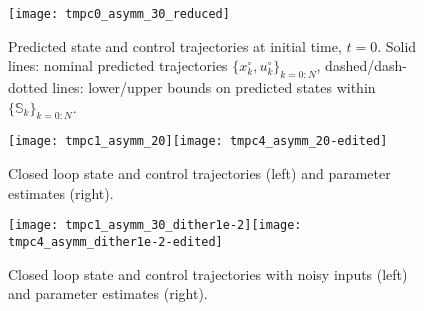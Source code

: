 \documentclass[final,5p,times,twocolumn,authoryear]{elsarticle}
\def\S{\mathbb{S}}
\begin{document}
\begin{figure}[ht]
\centerline{\texttt{[image: tmpc0\_asymm\_30\_reduced]}}%
\vspace{-3mm}%
\caption{Predicted state and control trajectories at initial time, $t =0$. Solid lines: nominal predicted trajectories $\{x^\circ_k,u^\circ_k\}_{k=0:N}$, dashed/dash-dotted lines: lower/upper bounds on predicted states within $\{\S_k\}_{k=0:N}$.}  
\vspace{-4mm}%
\label{fig:predicted_trajectories}
\end{figure}

\begin{figure}[h!]
\centerline{\texttt{[image: tmpc1\_asymm\_20]}\texttt{[image: tmpc4\_asymm\_20-edited]}}%
\vspace{-3mm}%
\caption{Closed loop state and control trajectories (left) and parameter estimates (right).}
\label{fig:cl_trajectories}
\end{figure}



\begin{figure}[h]
\centerline{\texttt{[image: tmpc1\_asymm\_30\_dither1e-2]}\texttt{[image: tmpc4\_asymm\_dither1e-2-edited]}}%
\vspace{-3mm}%
\caption{Closed loop state and control trajectories with noisy inputs (left) and parameter estimates (right).}
\label{fig:cl_trajectories_dither}
\end{figure}
\end{document}
